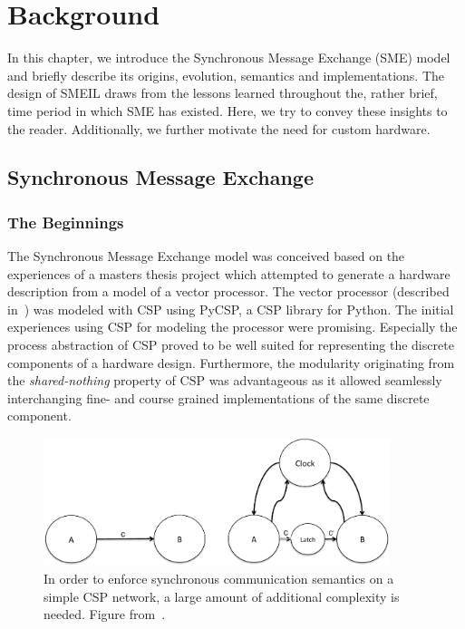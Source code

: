 \chapter{Background}
\label{sec:sme}
In this chapter, we introduce the Synchronous Message Exchange (SME) model and
briefly describe its origins, evolution, semantics and implementations. The
design of SMEIL draws from the lessons learned throughout the, rather brief,
time period in which SME has existed. Here, we try to convey these insights to
the reader. Additionally, we further motivate the need for custom hardware.

\section{Synchronous Message Exchange}

\subsection{The Beginnings}
The Synchronous Message Exchange model was conceived based on the experiences of
a masters thesis project \cite{Skaarup14} which attempted to generate a hardware
description from a model of a vector processor. The vector processor (described
in~\cite{rehr2013bpu}) was modeled with CSP using PyCSP, a CSP library for
Python. The initial experiences using CSP for modeling the processor were
promising. Especially the process abstraction of CSP proved to be well suited
for representing the discrete components of a hardware design. Furthermore, the
modularity originating from the {\itshape shared-nothing} property of CSP was
advantageous as it allowed seamlessly interchanging fine- and course grained
implementations of the same discrete component.

\begin{figure}
  \centering
  \includegraphics[width=0.9\textwidth]{figures/clocked.pdf}
  \caption{In order to enforce synchronous communication semantics on a simple
    CSP network, a large amount of additional complexity is needed. Figure
    from~\cite{vinter2014synchronous}.}
  \label{fig:clocked}
\end{figure}

